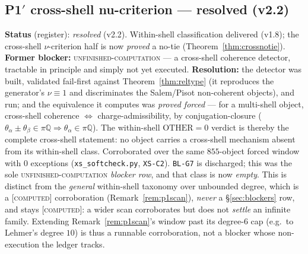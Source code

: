\documentclass[11pt]{article}
\newcommand{\tagC}{\textcolor{cC}{\textsc{[computed]}}}
\newcommand{\hx}[1]{\textcolor{cC}{\footnotesize\texttt{#1}}}
\newcommand{\Q}{\mathbb{Q}}
\theoremstyle{plain}
\theoremstyle{definition}
\theoremstyle{remark}
\begin{document}
\subsection{P1\texorpdfstring{$'$}{'} cross-shell nu-criterion --- resolved (v2.2)}\label{blk:p1cross}
\textbf{Status} (register): \emph{resolved} (v2.2). Within-shell classification
delivered (v1.8); the cross-shell $\nu$-criterion half is now \emph{proved} a
no-tie (Theorem~\ref{thm:crossnotie}). \textbf{Former blocker:}
\textsc{unfinished-computation} --- a cross-shell coherence detector, tractable in
principle and simply not yet executed. \textbf{Resolution:} the detector was
built, validated fail-first against Theorem~\ref{thm:reltype} (it reproduces the
generator's $\nu\equiv1$ and discriminates the Salem/Pisot non-coherent objects),
and run; and the equivalence it computes was \emph{proved forced} --- for a
multi-shell object, cross-shell coherence $\iff$ charge-admissibility, by
conjugation-closure ($\theta_\alpha\pm\theta_\beta\in\pi\Q\Rightarrow
\theta_\alpha\in\pi\Q$). The within-shell $\mathrm{OTHER}=0$ verdict is thereby
the complete cross-shell statement: no object carries a cross-shell mechanism
absent from its within-shell class. Corroborated over the same $855$-object
forced window with $0$ exceptions (\texttt{xs\_softcheck.py}, \hx{XS-C2}).
\hx{BL-G7} is discharged; this was the sole \textsc{unfinished-computation}
\emph{blocker row}, and that class is now \emph{empty}. This is distinct from the
\emph{general} within-shell taxonomy over unbounded degree, which is a \tagC{}
corroboration (Remark~\ref{rem:p1scan}), \emph{never} a \S\ref{sec:blockers} row,
and stays \tagC{}: a wider scan corroborates but does not \emph{settle} an
infinite family. Extending Remark~\ref{rem:p1scan}'s window past its
degree-$6$ cap (e.g.\ to Lehmer's degree $10$) is thus a runnable corroboration,
not a blocker whose non-execution the ledger tracks.
\end{document}
